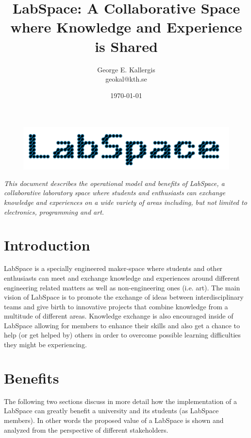 \documentclass[a4paper, 11pt]{article}
\title{LabSpace: A Collaborative Space where Knowledge and Experience is Shared}
\author{George E. Kallergis\\geokal@kth.se}
\date{\today{}}
\begin{document}
\maketitle

\begin{figure}[h!]
  \begin{center}
    \includegraphics[width=\textwidth,height=\textheight,keepaspectratio]{imagery/logo.png}
    \label{fig:dneaf}
  \end{center}
\end{figure}

\textit{This document describes the operational model and benefits of LabSpace, a collaborative laboratory space where students and enthusiasts can exchange knowledge and experiences on a wide variety of areas including, but not limited to electronics, programming and art.}

\newpage

\section*{Introduction}
LabSpace is a specially engineered maker-space where students and other enthusiasts can meet and exchange knowledge and experiences around different engineering related matters as well as non-engineering ones (i.e. art). The main vision of LabSpace is to promote the exchange of ideas between interdisciplinary teams and give birth to innovative projects that combine knowledge from a multitude of different areas. Knowledge exchange is also encouraged inside of LabSpace allowing for members to enhance their skills and also get a chance to help (or get helped by) others in order to overcome possible learning difficulties they might be experiencing.

\section{Benefits}
The following two sections discuss in more detail how the implementation of a LabSpace can greatly benefit a university and its students (as LabSpace members). In other words the proposed value of a LabSpace is shown and analyzed from the perspective of different stakeholders.
\end{document}

